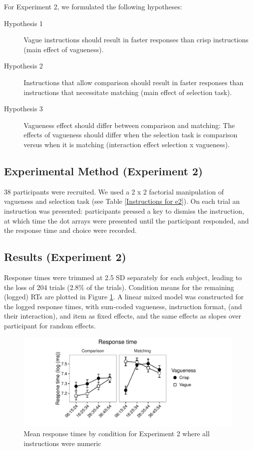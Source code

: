 For Experiment 2, we formulated the following hypotheses:

\begin{description}
\item [Hypothesis 1] Vague instructions should result in faster responses than crisp instructions (main effect of vagueness).
\item [Hypothesis 2] Instructions that allow comparison should result in faster responses than instructions that necessitate matching (main effect of selection task).
\item [Hypothesis 3] Vagueness effect should differ between comparison and matching: The effects of vagueness should differ when the selection task is comparison versus when it is matching (interaction effect selection x vagueness).
\end{description}

\subsection{Experimental Method (Experiment 2)}

38 participants were recruited. We used a 2 x 2 factorial manipulation of vagueness and selection task (see Table \ref{Instructions for e2}). On each trial an instruction was presented: participants pressed a key to dismiss the instruction, at which time the dot arrays were presented until the participant responded, and the response time and choice were recorded.

\subsection{Results (Experiment 2)}


Response times were trimmed at 2.5 SD separately for each subject, leading to the loss of 204 trials (2.8\% of the trials). Condition means for the remaining (logged) RTs are plotted in Figure \ref{resultsD-exp-2}. A linear mixed model was constructed for the logged response times, with sum-coded vagueness, instruction format, (and their interaction), and item as fixed effects, and the same effects as slopes over participant for random effects.

\begin{figure}[htbp]
\centering
\includegraphics[width=\textwidth]{figures/De2-rtplot-1.pdf}
\caption{Mean response times by condition for Experiment 2 where all instructions were numeric}
\label{resultsD-exp-2}
\end{figure}


